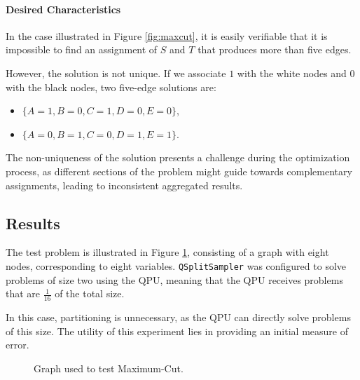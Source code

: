 \paragraph{Desired Characteristics} In the case illustrated in Figure \ref{fig:maxcut}, it is easily verifiable that it is impossible to find an assignment of $S$ and $T$ that produces more than five edges.

However, the solution is not unique. 
If we associate $1$ with the white nodes and $0$ with the black nodes, two five-edge solutions are: 
\begin{itemize}
    \item $\{A=1,B=0,C=1,D=0,E=0\}$,
    \item $\{A=0,B=1,C=0,D=1,E=1\}$.
\end{itemize}

The non-uniqueness of the solution presents a challenge during the optimization process, as different sections of the problem might guide towards complementary assignments, leading to inconsistent aggregated results.

\subsection{Results}

The test problem is illustrated in Figure \ref{fig:maxcut_test}, consisting of a graph with eight nodes, corresponding to eight variables. 
\texttt{QSplitSampler} was configured to solve problems of size two using the QPU, meaning that the QPU receives problems that are $\frac{1}{16}$ of the total size.

In this case, partitioning is unnecessary, as the QPU can directly solve problems of this size. 
The utility of this experiment lies in providing an initial measure of error.

\begin{figure}[H]
    \centering
    \caption{Graph used to test Maximum-Cut.}
    \label{fig:maxcut_test}
\end{figure}

